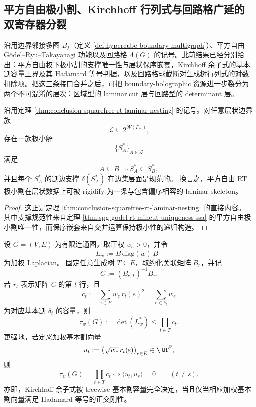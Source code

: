 \subsection{平方自由极小割、Kirchhoff 行列式与回路格广延的双寄存器分裂}\label{subsec:conclusion-squarefree-cut-kirchhoff-loop-double-register}
沿用边界邻接多图 \(B_f\)（定义 \ref{def:hypercube-boundary-multigraph}）、平方自由 Gödel--Ryu--Takayanagi 功能以及回路格 \(\Lambda(G)\) 的记号。此前结果已经分别给出：平方自由权下极小割的支撑唯一性与层状保序嵌套，Kirchhoff 余子式的基本割容量上界及其 Hadamard 等号判据，以及回路格球截断对生成树行列式的对数扣除项。把这三条接口合并之后，可把 boundary-holographic 资源进一步裂分为两个不可混淆的层次：区域型的 laminar cut 层与回路型的 determinant 层。

\begin{theorem}\label{thm:conclusion-squarefree-cut-layered-normalization}
沿用定理 \ref{thm:conclusion-squarefree-rt-laminar-nesting} 的记号。对任意层状边界族
\[
\mathcal L\subseteq 2^{\partial V(\Gamma_m)},
\]
存在一族极小解
\[
\{S_A^\ast\}_{A\in\mathcal L}
\]
满足
\[
A\subseteq B \Longrightarrow S_A^\ast\subseteq S_B^\ast,
\]
并且每个 \(S_A^\ast\) 的割边支撑 \(\delta(S_A^\ast)\) 在边集层面是规范的。
换言之，平方自由 RT 极小割在层状数据上可被 rigidify 为一条与包含偏序相容的 laminar skeleton。
\end{theorem}

\begin{proof}
这正是定理 \ref{thm:conclusion-squarefree-rt-laminar-nesting} 的直接内容。
其中支撑规范性来自定理 \ref{thm:spg-godel-rt-mincut-uniqueness-ssa} 的平方自由极小割唯一性，而保序嵌套来自交并运算保持极小性的递归构造。
\end{proof}

\begin{theorem}\label{thm:conclusion-kirchhoff-hadamard-equality-criterion}
设 \(G=(V,E)\) 为有限连通图，取正权 \(w_e>0\)，并令
\[
L_w:=B\,\mathrm{diag}(w)\,B^\top
\]
为加权 Laplacian。
固定任意生成树 \(T\subseteq E\)，取约化关联矩阵 \(B_r\)，并记
\[
C:=(B_{r,T})^{-1}B_r.
\]
若 \(r_t\) 表示矩阵 \(C\) 的第 \(t\) 行，且
\[
c_t:=\sum_{e\in E}w_e\,r_t(e)^2=\sum_{e\in\delta_t}w_e
\]
为对应基本割 \(\delta_t\) 的容量，则
\[
\tau_w(G):=\det(L_w^\ast)\le \prod_{t\in T}c_t.
\]
更强地，若定义加权基本割向量
\[
u_t:=\bigl(\sqrt{w_e}\,r_t(e)\bigr)_{e\in E}\in\RR^E,
\]
则
\[
\tau_w(G)=\prod_{t\in T}c_t
\iff
\langle u_t,u_s\rangle=0\qquad (t\neq s).
\]
亦即，Kirchhoff 余子式被 treewise 基本割容量完全决定，当且仅当相应加权基本割向量满足 Hadamard 等号的正交刚性。
\end{theorem}

